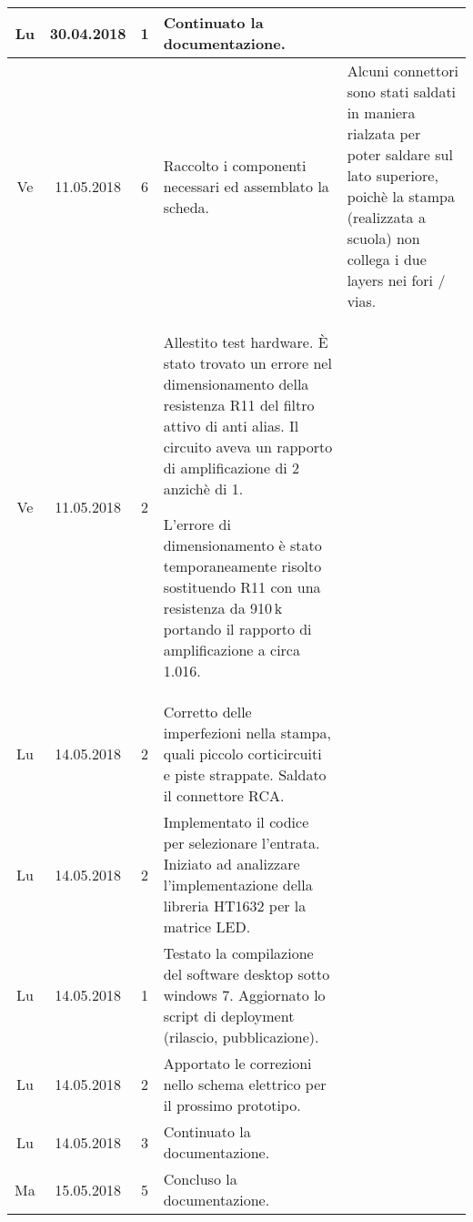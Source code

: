 \documentclass[a4paper]{article}
\newcommand{\journalentry}[5]{%
    #1 & #2 & #3 & #4 & #5 \\\hline
}
\begin{document}
\begin{tabularx}{\textwidth}{| c | c | c | p{} | X |}
        \journalentry{Lu}{30.04.2018}{1}{
            Continuato la documentazione.
        }{}

        \journalentry{Ve}{11.05.2018}{6}{
            Raccolto i componenti necessari ed assemblato la scheda.
        }{
            Alcuni connettori sono stati saldati in maniera rialzata per poter 
            saldare sul lato superiore, poich\`e la stampa (realizzata a scuola)
            non collega i due layers nei fori / vias.
        }

        \journalentry{Ve}{11.05.2018}{2}{
            Allestito test hardware.
            \`E stato trovato un errore nel dimensionamento della resistenza 
            R11 del filtro attivo di anti alias. Il circuito aveva un rapporto
            di amplificazione di 2 anzich\`e di 1.

            L'errore di dimensionamento \`e stato temporaneamente risolto 
            sostituendo R11 con una resistenza da 910\,k portando il rapporto
            di amplificazione a circa 1.016.
        }{
        }

        \journalentry{Lu}{14.05.2018}{2}{
            Corretto delle imperfezioni nella stampa, quali piccolo corticircuiti
            e piste strappate. Saldato il connettore RCA.
        }{}

        \journalentry{Lu}{14.05.2018}{2}{
            Implementato il codice per selezionare l'entrata.
            Iniziato ad analizzare l'implementazione della libreria HT1632 per
            la matrice LED.
        }{}

        \journalentry{Lu}{14.05.2018}{1}{
            Testato la compilazione del software desktop sotto windows 7.
            Aggiornato lo script di deployment (rilascio, pubblicazione).
        }{}

        \journalentry{Lu}{14.05.2018}{2}{
            Apportato le correzioni nello schema elettrico per il prossimo
            prototipo.
        }{}

        \journalentry{Lu}{14.05.2018}{3}{
            Continuato la documentazione.
        }{}

        \journalentry{Ma}{15.05.2018}{5}{
            Concluso la documentazione.
        }{}

    \end{tabularx}
\end{document}
